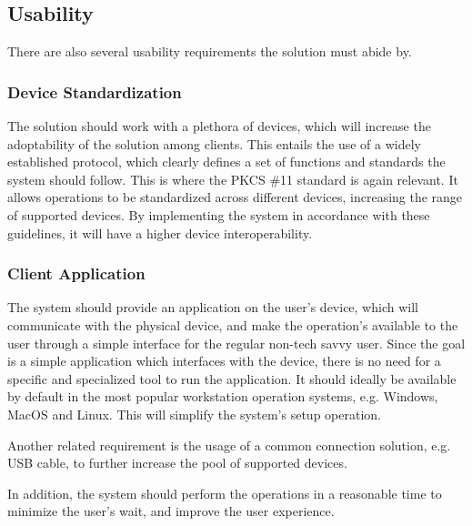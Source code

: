 \subsection{Usability}\label{chap:problem:services:usability}
There are also several usability requirements the solution must abide by.

\subsubsection{Device Standardization}

The solution should work with a plethora of devices, which will increase the adoptability of the solution among clients. This entails the use of a widely established protocol, which clearly defines a set of functions and standards the system should follow.
This is where the \ac{PKCS} \#11 standard is again relevant. It allows operations to be standardized across different devices, increasing the range of supported devices. By implementing the system in accordance with these guidelines, it will have a higher device interoperability.

\subsubsection{Client Application}

The system should provide an application on the user's device, which will communicate with the physical device, and make the operation's available to the user through a simple interface for the regular non-tech savvy user.
Since the goal is a simple application which interfaces with the device, there is no need for a specific and specialized tool to run the application. It should ideally be available by default in the most popular workstation operation systems, e.g. Windows, MacOS and Linux. This will simplify the system's setup operation.

Another related requirement is the usage of a common connection solution, e.g. USB cable, to further increase the pool of supported devices.

In addition, the system should perform the operations in a reasonable time to minimize the user's wait, and improve the user experience.
